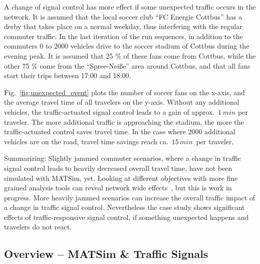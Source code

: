 A change of signal control has more effect if some unexpected traffic occurs in the network. 
It is assumed that the local soccer club ``FC Energie Cottbus'' has a derby that takes place on a normal weekday, thus interfering with the regular commuter traffic. 
In the last iteration of the run sequences, in addition to the commuters $0$ to $2000$ vehicles drive to the soccer stadium of Cottbus during the evening peak. 
It is assumed that 25 \% of these fans come from Cottbus,
while the other 75 \% come from the ``Spree-Nei{\ss}e'' area around Cottbus, and that all fans start their trips between 17:00 and 18:00. 

Fig.~\ref{fig:unexpected_event} plots the number of soccer fans on
the x-axis, and the average travel time of all travelers on the
y-axis. Without any additional vehicles,
the traffic-actuated signal control leads to a gain of
approx.~$1 \, min$ per traveler.
The more additional traffic is approaching the stadium, the more the traffic-actuated control saves travel time. In the case where 2000 additional vehicles are on the road, travel time savings reach ca.~$15\, min$~per traveler. 

Summarizing: Slightly jammed commuter scenarios, where a change in traffic signal control leads to heavily decreased overall travel time, have not been simulated with MATSim, yet. 
Looking at different objectives with more fine grained analysis tools can reveal network wide effects~\citep[e.g.~see the analysis using macroscopic fundamental diagrams, pp.114]{Grether2014PhD}, but this is work in progress.  
More heavily jammed scenarios can increase the overall traffic impact of a change in traffic signal control. Nevertheless the case study shows significant effects of traffic-responsive signal control, if something unexpected happens and travelers do not react.  

\subsection{Overview -- MATSim \& Traffic Signals}

